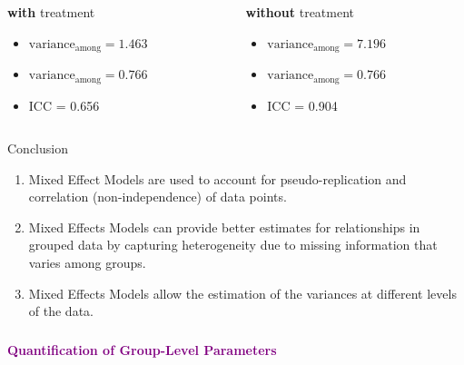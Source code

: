 \documentclass{beamer}
\begin{document}
\begin{frame}[fragile]
  \begin{columns}[onlytextwidth] 
  \begin{column}{0.5\textwidth}
  \textbf{with} treatment \\
  \begin{itemize}
      \item $\text{variance}_{\text{among}} = 1.463$
      \item $\text{variance}_{\text{among}} = 0.766$ 
      \item ICC =  0.656
  \end{itemize}

  \end{column}
    \hspace{0.02\textwidth} %
    \begin{column}{0.5\textwidth}
    \textbf{without} treatment
    \begin{itemize}
      \item $\text{variance}_{\text{among}} = 7.196$
      \item $\text{variance}_{\text{among}} = 0.766$ 
      \item ICC =   0.904
  \end{itemize}
    \end{column}
  \end{columns}

\end{frame}

\begin{frame}{Conclusion}
  \begin{enumerate}
      \item Mixed Effect Models are used to account for pseudo-replication and correlation (non-independence) of data points.
      \item Mixed Effects Models can provide better estimates for relationships in grouped data by capturing heterogeneity due to missing information that varies among groups.
      \item Mixed Effects Models allow the estimation of the variances at different levels of the data.
    \end{enumerate}
\end{frame}


\begin{frame}
  \frametitle{}
  \begin{center}
    \huge\textbf{\textcolor{purple}{Quantification of Group-Level Parameters}}
  \end{center}
\end{frame}
\end{document}
